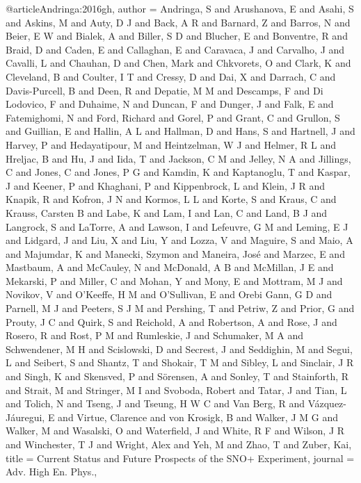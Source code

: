 {@article{Andringa:2016gh,
author = {Andringa, S and Arushanova, E and Asahi, S and Askins, M and Auty, D J and Back, A R and Barnard, Z and Barros, N and Beier, E W and Bialek, A and Biller, S D and Blucher, E and Bonventre, R and Braid, D and Caden, E and Callaghan, E and Caravaca, J and Carvalho, J and Cavalli, L and Chauhan, D and Chen, Mark and Chkvorets, O and Clark, K and Cleveland, B and Coulter, I T and Cressy, D and Dai, X and Darrach, C and Davis-Purcell, B and Deen, R and Depatie, M M and Descamps, F and Di Lodovico, F and Duhaime, N and Duncan, F and Dunger, J and Falk, E and Fatemighomi, N and Ford, Richard and Gorel, P and Grant, C and Grullon, S and Guillian, E and Hallin, A L and Hallman, D and Hans, S and Hartnell, J and Harvey, P and Hedayatipour, M and Heintzelman, W J and Helmer, R L and Hreljac, B and Hu, J and Iida, T and Jackson, C M and Jelley, N A and Jillings, C and Jones, C and Jones, P G and Kamdin, K and Kaptanoglu, T and Kaspar, J and Keener, P and Khaghani, P and Kippenbrock, L and Klein, J R and Knapik, R and Kofron, J N and Kormos, L L and Korte, S and Kraus, C and Krauss, Carsten B and Labe, K and Lam, I and Lan, C and Land, B J and Langrock, S and LaTorre, A and Lawson, I and Lefeuvre, G M and Leming, E J and Lidgard, J and Liu, X and Liu, Y and Lozza, V and Maguire, S and Maio, A and Majumdar, K and Manecki, Szymon and Maneira, Jos{\'e} and Marzec, E and Mastbaum, A and McCauley, N and McDonald, A B and McMillan, J E and Mekarski, P and Miller, C and Mohan, Y and Mony, E and Mottram, M J and Novikov, V and O{\textquoteright}Keeffe, H M and O{\textquoteright}Sullivan, E and Orebi Gann, G D and Parnell, M J and Peeters, S J M and Pershing, T and Petriw, Z and Prior, G and Prouty, J C and Quirk, S and Reichold, A and Robertson, A and Rose, J and Rosero, R and Rost, P M and Rumleskie, J and Schumaker, M A and Schwendener, M H and Scislowski, D and Secrest, J and Seddighin, M and Segui, L and Seibert, S and Shantz, T and Shokair, T M and Sibley, L and Sinclair, J R and Singh, K and Skensved, P and S{\"o}rensen, A and Sonley, T and Stainforth, R and Strait, M and Stringer, M I and Svoboda, Robert and Tatar, J and Tian, L and Tolich, N and Tseng, J and Tseung, H W C and Van Berg, R and V{\'a}zquez-J{\'a}uregui, E and Virtue, Clarence and von Krosigk, B and Walker, J M G and Walker, M and Wasalski, O and Waterfield, J and White, R F and Wilson, J R and Winchester, T J and Wright, Alex and Yeh, M and Zhao, T and Zuber, Kai},
title = {{Current Status and Future Prospects of the SNO+ Experiment}},
journal = {Adv. High En. Phys.},
}}
